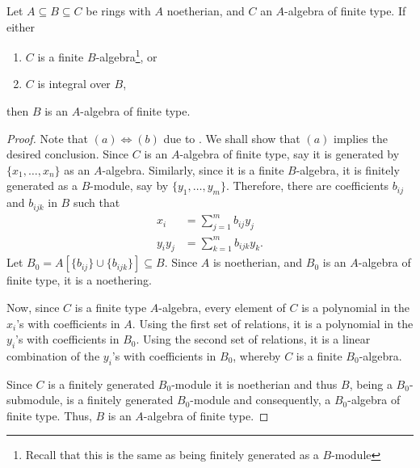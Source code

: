 \begin{lemma}
    Let $A\subseteq B\subseteq C$ be rings with $A$ noetherian, and $C$ an $A$-algebra of finite type. If either 
    \begin{enumerate}[label=(\alph*)]
        \item $C$ is a finite $B$-algebra\footnote{Recall that this is the same as being finitely generated as a $B$-module}, or 
        \item $C$ is integral over $B$,
    \end{enumerate}
    then $B$ is an $A$-algebra of finite type.
\end{lemma}
\begin{proof}
    Note that $(a)\iff(b)$ due to . We shall show that $(a)$ implies the desired conclusion. Since $C$ is an $A$-algebra of finite type, say it is generated by $\{x_1,\ldots,x_n\}$ as an $A$-algebra. Similarly, since it is a finite $B$-algebra, it is finitely generated as a $B$-module, say by $\{y_1,\ldots,y_m\}$. Therefore, there are coefficients $b_{ij}$ and $b_{ijk}$ in $B$ such that 
    \begin{align*}
        x_i &= \sum_{j = 1}^m b_{ij}y_j\\
        y_iy_j &= \sum_{k = 1}^m b_{ijk}y_k.
    \end{align*}
    Let $B_0 = A[\{b_{ij}\}\cup\{b_{ijk}\}]\subseteq B$. Since $A$ is noetherian, and $B_0$ is an $A$-algebra of finite type, it is a noethering. 
    
    Now, since $C$ is a finite type $A$-algebra, every element of $C$ is a polynomial in the $x_i$'s with coefficients in $A$. Using the first set of relations, it is a polynomial in the $y_i$'s with coefficients in $B_0$. Using the second set of relations, it is a linear combination of the $y_i$'s with coefficients in $B_0$, whereby $C$ is a finite $B_0$-algebra.

    Since $C$ is a finitely generated $B_0$-module it is noetherian and thus $B$, being a $B_0$-submodule, is a finitely generated $B_0$-module and consequently, a $B_0$-algebra of finite type. Thus, $B$ is an $A$-algebra of finite type.
\end{proof}

